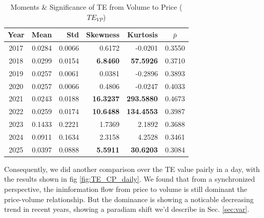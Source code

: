 \documentclass{elsarticle}
\def\rightarrow{}%
\begin{document}
\begin{table}[H]
  \caption{Moments \& Significance of TE from Volume to Price ($TE_{V \rightarrow P}$)}
  \label{tab:te_v2p_stats}
  \centering
  \begin{tabular}{crrrrc}
    \hline\noalign{\smallskip}
    \textbf{Year} & \textbf{Mean} & \textbf{Std} & \textbf{Skewness} & \textbf{Kurtosis} & \textbf{$\bar{p}$} \\
    \hline\noalign{\smallskip}
    2017 & 0.0284 & 0.0066 & 0.6172 & -0.0201 & 0.3550 \\
    2018 & 0.0299 & 0.0154 & \textbf{6.8460} & \textbf{57.5926} & 0.3710 \\
    2019 & 0.0257 & 0.0061 & 0.0381 & -0.2896 & 0.3893 \\
    2020 & 0.0257 & 0.0066 & 0.4806 & -0.0247 & 0.4033 \\
    2021 & 0.0243 & 0.0188 & \textbf{16.3237} & \textbf{293.5880} & 0.4673 \\
    2022 & 0.0259 & 0.0174 & \textbf{10.6488} & \textbf{134.4553} & 0.3987 \\
    2023 & 0.1433 & 0.2221 & 1.7369 & 2.1892 & 0.3688 \\
    2024 & 0.0911 & 0.1634 & 2.3158 & 4.2528 & 0.3461 \\
    2025 & 0.0397 & 0.0888 & \textbf{5.5911} & \textbf{30.6203} & 0.3084 \\
    \hline
  \end{tabular}
\end{table}
Consequently, we did another comparison over the TE value pairly in a day, with the results shown in fig \ref{fig:TE_CP_daily}. We found that from a synchronized perspective, the ininformation flow from price to volume is still dominant the price-volume relationship. But the dominance is showing a noticable decreasing trend in recent years, showing a paradiam shift we'd describe in Sec. \ref{sec:var}.
\end{document}
